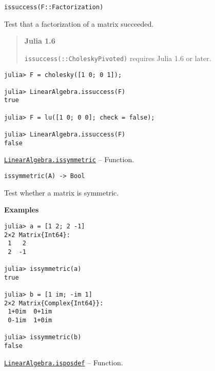 \begin{adjustwidth}{2em}{0pt}


\begin{verbatim}
issuccess(F::Factorization)
\end{verbatim}

Test that a factorization of a matrix succeeded.

\begin{quote}
\textbf{Julia 1.6}

\texttt{issuccess(::CholeskyPivoted)} requires Julia 1.6 or later.

\end{quote}

\begin{verbatim}
julia> F = cholesky([1 0; 0 1]);

julia> LinearAlgebra.issuccess(F)
true

julia> F = lu([1 0; 0 0]; check = false);

julia> LinearAlgebra.issuccess(F)
false
\end{verbatim}



\end{adjustwidth}
\hypertarget{2326080217547608316}{}
\hyperlink{2326080217547608316}{\texttt{LinearAlgebra.issymmetric}}  -- {Function.}

\begin{adjustwidth}{2em}{0pt}


\begin{verbatim}
issymmetric(A) -> Bool
\end{verbatim}

Test whether a matrix is symmetric.

\textbf{Examples}


\begin{verbatim}
julia> a = [1 2; 2 -1]
2×2 Matrix{Int64}:
 1   2
 2  -1

julia> issymmetric(a)
true

julia> b = [1 im; -im 1]
2×2 Matrix{Complex{Int64}}:
 1+0im  0+1im
 0-1im  1+0im

julia> issymmetric(b)
false
\end{verbatim}



\end{adjustwidth}
\hypertarget{13841568437070319804}{}
\hyperlink{13841568437070319804}{\texttt{LinearAlgebra.isposdef}}  -- {Function.}

